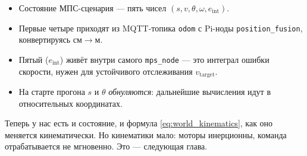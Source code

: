 \begin{itemize}
  \item Состояние МПС-сценария --- пять чисел $(s, v, \theta, \omega, e_\text{int})$.
  \item Первые четыре приходят из MQTT-топика \texttt{odom} с Pi-ноды
        \texttt{position\_fusion}, конвертируясь см$\to$м.
  \item Пятый ($e_\text{int}$) живёт внутри самого \texttt{mps\_node}
        --- это интеграл ошибки скорости, нужен для устойчивого
        отслеживания $v_\text{target}$.
  \item На старте прогона $s$ и $\theta$ \emph{обнуляются}: дальнейшие
        вычисления идут в относительных координатах.
\end{itemize}

Теперь у нас есть и состояние, и формула \eqref{eq:world_kinematics}, как
оно меняется кинематически. Но кинематики мало: моторы инерционны,
команда отрабатывается не мгновенно. Это --- следующая глава.
